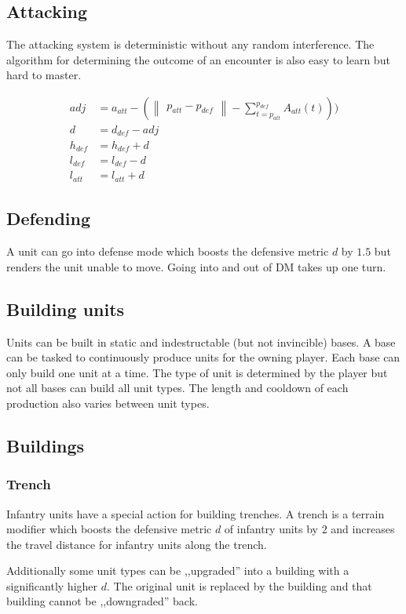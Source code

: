 \subsection{Attacking}
The attacking system is deterministic without any random interference. The algorithm for determining the outcome
of an encounter is also easy to learn but hard to master.

\begin{align}
    adj &= a_{att} - (\begin{Vmatrix}p_{att} - p_{def}\end{Vmatrix} - \sum_{t=p_{att}}^{p_{def}} A_{att}(t))) \\
    d &= d_{def} - adj \\
    h_{def} &= h_{def} + d \\
    l_{def} &= l_{def} - d \\
    l_{att} &= l_{att} + d
\end{align}

\subsection{Defending} %
A unit can go into defense mode which boosts the defensive metric $d$ by $1.5$ but renders the unit unable to move.
Going into and out of DM takes up one turn.
\subsection{Building units} %
Units can be built in static and indestructable (but not invincible) bases.
A base can be tasked to continuously produce units for the owning player. Each base can only build one unit
at a time. The type of unit is determined by the player but not all bases can build all unit types. The length and cooldown
of each production also varies between unit types.
\subsection{Buildings} %
\subsubsection{Trench}
Infantry units have a special action for building trenches. A trench is a terrain modifier which boosts the
defensive metric $d$ of infantry units by $2$ and increases the travel distance for infantry units along the trench.

Additionally some unit types can be ,,upgraded'' into a building with a significantly higher $d$. The original unit is replaced by the
building and that building cannot be ,,downgraded'' back.
